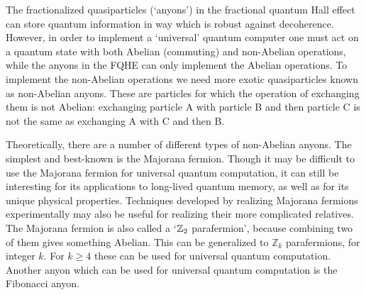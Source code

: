 The fractionalized quasiparticles (`anyons') in the fractional quantum Hall effect can store quantum information in way which is robust against decoherence. However, in order to implement a `universal' quantum computer one must act on a quantum state with both Abelian (commuting) and non-Abelian operations,\cite{FreedmanUniversal} while the anyons in the FQHE can only implement the Abelian operations. To implement the non-Abelian operations we need more exotic quasiparticles known as non-Abelian anyons. These are particles for which the operation of exchanging them is not Abelian: exchanging particle A with particle B and then particle C is not the same as exchanging A with C and then B. 

Theoretically, there are a number of different types of non-Abelian anyons. The simplest and best-known is the Majorana fermion. Though it may be difficult to use the Majorana fermion for universal quantum computation,\cite{FuMajorana} it can still be interesting for its applications to long-lived quantum memory\cite{KitaevWireMajorana:01}, as well as for its unique physical properties. Techniques developed by realizing Majorana fermions experimentally may also be useful for realizing their more complicated relatives. The Majorana fermion is also called a `$\mathbb{Z}_2$ parafermion', because combining two of them gives something Abelian. This can be generalized to $\mathbb{Z}_k$ parafermions, for integer $k$. For $k\ge 4$ these can be used for universal quantum computation\cite{FreedmanUniversal,CuiWang}. Another anyon which can be used for universal quantum computation is the Fibonacci anyon.

